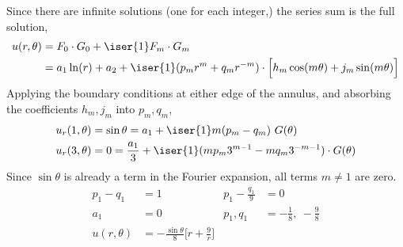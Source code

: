\begin{enumerate}
\begin{enumerate}
                    Since there are infinite solutions (one for each integer,) the
                    series sum is the full solution,
                    \begin{align}
                        u(r, \theta) & = F_0 \cdot G_0 + \iser{1} F_m \cdot G_m \\
                                     & = a_1 \ln(r) + a_2 + \iser{1}
                        (p_m r^m + q_m r^{-m}) \cdot \Big[h_m \cos(m\theta)
                            + j_m \sin(m\theta)\Big]
                    \end{align}
                    Applying the boundary conditions at either edge of the annulus,
                    and absorbing the coefficients $ h_m, j_m $ into $ p_m, q_m $,
                    \begin{align}
                        u_r(1, \theta) & = \sin \theta = a_1 + \iser{1} m(p_m - q_m)
                        \ G(\theta)                                                    \\
                        u_r(3, \theta) & = 0 =  \frac{a_1}{3} + \iser{1} (mp_m 3^{m-1}
                        - mq_m 3^{-m-1}) \cdot G(\theta)
                    \end{align}
                    Since $ \sin \theta $ is already a term in the Fourier expansion,
                    all terms $ m \neq 1 $ are zero.
                    \begin{align}
                        p_1 - q_1           & = 1                     &
                        p_1 - \frac{q_1}{9} & = 0                       \\
                        a_1                 & = 0                     &
                        p_1, q_1            & = -\frac{1}{8},
                        \ -\frac{9}{8}                                  \\
                        u(r, \theta)        & = -\frac{\sin\theta}{8}
                        \Bigg[r + \frac{9}{r} \Bigg]
                    \end{align}
          \end{enumerate}


\end{enumerate}
